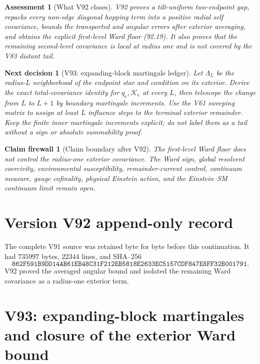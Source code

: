 \documentclass[11pt]{article}
\newtheorem{firewall}[theorem]{Claim firewall}
\newtheorem{decision}[theorem]{Next decision}
\newtheorem{assessment}[theorem]{Assessment}
\theoremstyle{remark}
\begin{document}
\begin{assessment}[What V92 closes]
\label{ass:v17v92-status}
V92 proves a tilt-uniform two-endpoint gap, repacks every non-edge
diagonal hopping term into a positive radial self covariance, bounds
the transported and angular errors after exterior averaging, and
obtains the explicit first-level Ward floor (92.19).  It also proves
that the remaining second-level covariance is local at radius one and
is not covered by the V83 distant tail.
\end{assessment}

\begin{decision}[V93: expanding-block martingale ledger]
\label{dec:v17v92-next}
Let \(\Lambda_L\) be the radius-\(L\) neighborhood of the endpoint
star and condition on its exterior.  Derive the exact total-covariance
identity for \(q_e,\mathcal K_e\) at every \(L\), then telescope the
change from \(L\) to \(L+1\) by boundary martingale increments.  Use
the V61 sweeping matrix to assign at least \(L\) influence steps to
the terminal exterior remainder.  Keep the finite inner martingale
increments explicit; do not label them as a tail without a sign or
absolute summability proof.
\end{decision}

\begin{firewall}[Claim boundary after V92]
\label{fire:v17v92}
The first-level Ward floor does not control the radius-one exterior
covariance.  The Ward sign, global resolvent coercivity,
environmental susceptibility, remainder-current control, continuum
measure, gauge cofinality, physical Einstein action, and the
Einstein--SM continuum limit remain open.
\end{firewall}

\section*{Version V92 append-only record}
The complete V91 source was retained byte for byte before this
continuation.  It had \(735997\) bytes, \(22344\) lines, and SHA--256
\[
 \texttt{862F591B9DD14AB61EB48C31F212EB5818E2633EC5157CDF847E8FF32B001791}.
\]
V92 proved the averaged angular bound and isolated the remaining Ward
covariance as a radius-one exterior term.


\section{V93: expanding-block martingales and closure of the exterior Ward bound}
\label{sec:v17v93}
\end{document}
